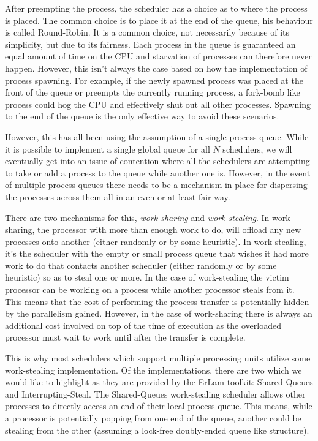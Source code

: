 After preempting the process, the scheduler has a choice as to where the process
is placed. The common choice is to place it at the end of the queue, his 
behaviour is called Round-Robin. It is a common choice, not necessarily because
of its simplicity, but due to its fairness. Each process in the queue is 
guaranteed an equal amount of time on the CPU and starvation of processes can 
therefore never happen. However, this isn't always the case based on how the 
implementation of process spawning. For example, if the newly spawned process
was placed at the front of the queue or preempts the currently running process,
a fork-bomb like process could hog the CPU and effectively shut out all other 
processes. Spawning to the end of the queue is the only effective way to avoid
these scenarios.

However, this has all been using the assumption of a single process queue. While
it is possible to implement a single global queue for all $N$ schedulers, we will
eventually get into an issue of contention where all the schedulers are 
attempting to take or add a process to the queue while another one is. However,
in the event of multiple process queues there needs to be a mechanism in place 
for dispersing the processes across them all in an even or at least fair way.

There are two mechanisms for this, \emph{work-sharing} and 
\emph{work-stealing}. In work-sharing, the processor with more than enough work
to do, will offload any new processes onto another (either randomly or by some
heuristic). In work-stealing, it's the scheduler with the empty or small process 
queue that wishes it had more work to do that contacts another scheduler (either 
randomly or by some heuristic) so as to steal one or more. In the case of 
work-stealing the victim processor can be working on a process while another
processor steals from it. This means that the cost of performing the process
transfer is potentially hidden by the parallelism gained. However, in the case 
of work-sharing there is always an additional cost involved on top of the time
of execution as the overloaded processor must wait to work until after the 
transfer is complete.

This is why most schedulers which support multiple processing units utilize 
some work-stealing implementation. Of the implementations, there are two which 
we would like to highlight as they are provided by the ErLam toolkit: 
Shared-Queues and Interrupting-Steal. The Shared-Queues work-stealing scheduler
allows other processes to directly access an end of their local process queue. 
This means, while a processor is potentially popping from one end of the queue,
another could be stealing from the other (assuming a lock-free doubly-ended 
queue like structure).

